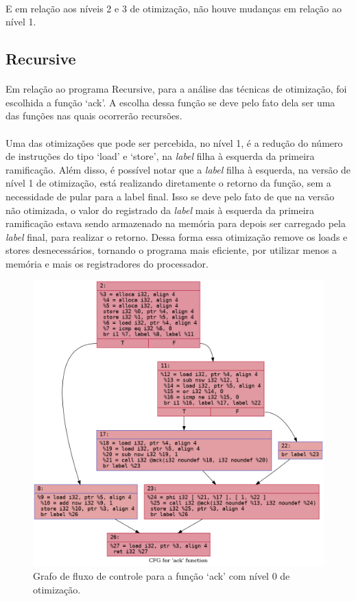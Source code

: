 \documentclass[12pt]{article}
\begin{document}
\paragraph{}E em relação aos níveis 2 e 3 de otimização, não houve mudanças em relação ao nível 1.

\FloatBarrier

\subsection{Recursive}

\paragraph{}Em relação ao programa Recursive, para a análise das técnicas de otimização, foi escolhida a função ‘ack’. A escolha dessa função se deve pelo fato dela ser uma das funções nas quais ocorrerão recursões.

\paragraph{}Uma das otimizações que pode ser percebida, no nível 1, é a redução do número de instruções do tipo ‘load’ e ‘store’, na \textit{label} filha à esquerda da primeira ramificação. Além disso, é possível notar que a \textit{label} filha à esquerda, na versão de nível 1 de otimização, está realizando diretamente o retorno da função, sem a necessidade de pular para a label final. Isso se deve pelo fato de que na versão não otimizada, o valor do registrado da \textit{label} mais à esquerda da primeira ramificação estava sendo armazenado na memória para depois ser carregado pela \textit{label} final, para realizar o retorno. Dessa forma essa otimização remove os loads e stores desnecessários, tornando o programa mais eficiente, por utilizar menos a memória e mais os registradores do processador.

\begin{figure}
    \centering
    \includegraphics[width=0.5\linewidth]{recursive_.ack_O0.png}
    \caption{Grafo de fluxo de controle para a função ‘ack’ com nível 0 de otimização.}
\end{figure}
\end{document}

